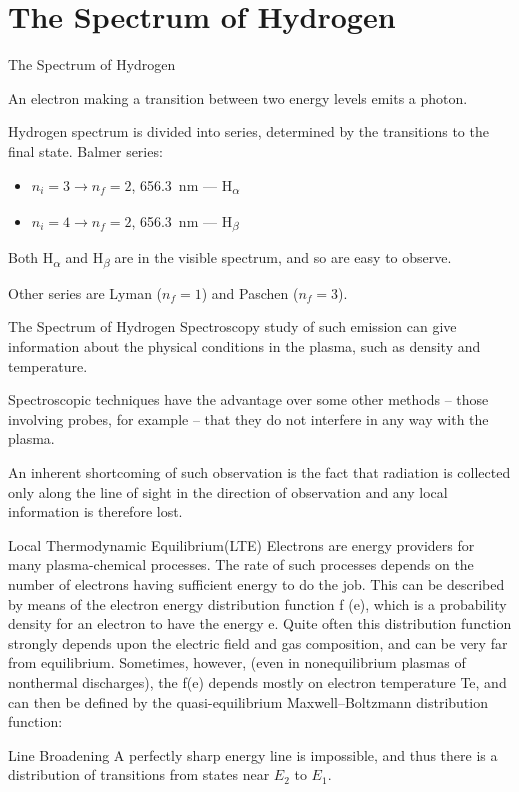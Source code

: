 \documentclass[draft]{beamer}
\begin{document}
\section{The Spectrum of Hydrogen}
\newcommand{\hydrogenspecrum}{The Spectrum of Hydrogen}
\begin{frame}{\hydrogenspecrum}
    

An electron making a transition between two energy levels emits a photon.

Hydrogen spectrum is divided into series, determined by the transitions to the final state.
Balmer series:
\begin{itemize}
    \item $n_i=3 \to n_f=2$, \SI{656.3}{\nm} --- H\textsubscript{$\alpha$}
    \item $n_i=4 \to n_f=2$, \SI{656.3}{\nm} --- H\textsubscript{$\beta$}
\end{itemize}
Both H\textsubscript{$\alpha$} and H\textsubscript{$\beta$} are in the visible spectrum, and so are easy to observe.

Other series are Lyman ($n_f=1$) and Paschen ($n_f=3$).
\end{frame}
\begin{frame}{\hydrogenspecrum}
Spectroscopy study of such emission can give information about the physical conditions in the plasma, such as density and temperature.

Spectroscopic techniques have the advantage over some other methods -- those involving probes, for example -- that they do not interfere in any way with the plasma.

An inherent shortcoming of such observation is the fact that radiation is collected only along the line of sight in the direction of observation and any local information is therefore lost.
\end{frame}
\newcommand{\lte}{Local Thermodynamic Equilibrium(LTE)}
\begin{frame}{\lte}
    Electrons are energy providers for many plasma-chemical processes. The rate of such processes depends on the number of electrons having sufficient energy to do the job. This can be described by means of the electron energy distribution function f (e), which is a probability density for an electron to have the energy e. Quite often this distribution function strongly depends upon the electric field and gas composition, and can be very far from equilibrium. Sometimes, however, (even in nonequilibrium plasmas of nonthermal discharges), the f(e) depends mostly on electron temperature Te, and can then be defined by the quasi-equilibrium Maxwell–Boltzmann distribution function:
\end{frame}
\begin{frame}{Line Broadening}
A perfectly sharp energy line is impossible, and thus there is a distribution of transitions from states near $E_2$ to $E_1$.
    
\end{frame}
\end{document}
